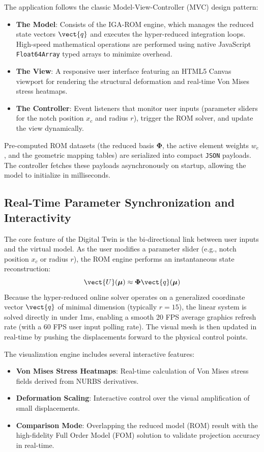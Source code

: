 The application follows the classic Model-View-Controller (MVC) design pattern:
\begin{itemize}
    \item \textbf{The Model}: Consists of the IGA-ROM engine, which manages the reduced state vectors $\vect{q}$ and executes the hyper-reduced integration loops. High-speed mathematical operations are performed using native JavaScript \texttt{Float64Array} typed arrays to minimize overhead.
    \item \textbf{The View}: A responsive user interface featuring an HTML5 Canvas viewport for rendering the structural deformation and real-time Von Mises stress heatmaps.
    \item \textbf{The Controller}: Event listeners that monitor user inputs (parameter sliders for the notch position $x_c$ and radius $r$), trigger the ROM solver, and update the view dynamically.
\end{itemize}

Pre-computed ROM datasets (the reduced basis $\boldsymbol{\Phi}$, the active element weights $w_e$, and the geometric mapping tables) are serialized into compact \texttt{JSON} payloads. The controller fetches these payloads asynchronously on startup, allowing the model to initialize in milliseconds.

\subsection{Real-Time Parameter Synchronization and Interactivity}
The core feature of the Digital Twin is the bi-directional link between user inputs and the virtual model. As the user modifies a parameter slider (e.g., notch position $x_c$ or radius $r$), the ROM engine performs an instantaneous state reconstruction:
\begin{equation}
    \vect{U}(\boldsymbol{\mu}) \approx \boldsymbol{\Phi} \vect{q}(\boldsymbol{\mu})
\end{equation}
Because the hyper-reduced online solver operates on a generalized coordinate vector $\vect{q}$ of minimal dimension (typically $r = 15$), the linear system is solved directly in under 1ms, enabling a smooth 20 FPS average graphics refresh rate (with a 60 FPS user input polling rate). The visual mesh is then updated in real-time by pushing the displacements forward to the physical control points.

The visualization engine includes several interactive features:
\begin{itemize}
    \item \textbf{Von Mises Stress Heatmaps}: Real-time calculation of Von Mises stress fields derived from NURBS derivatives.
    \item \textbf{Deformation Scaling}: Interactive control over the visual amplification of small displacements.
    \item \textbf{Comparison Mode}: Overlapping the reduced model (ROM) result with the high-fidelity Full Order Model (FOM) solution to validate projection accuracy in real-time.
\end{itemize}

